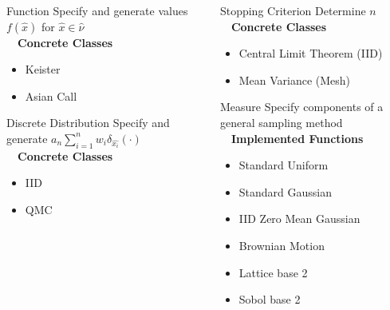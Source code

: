 \documentclass[final]{beamer}
\newlength{\onecolwid}
\newlength{\threecolwid}
\begin{document}
\begin{frame}[t]
\begin{columns}[t]
\begin{column}{\threecolwid}
\begin{columns}[t,totalwidth=\threecolwid]
\begin{column}{\onecolwid}
\begin{alertblock}{Function}
    Specify and generate values $f(\hat{x})$ for $\hat{x} \in \hat{\nu}$ \\~\
    \textbf{Concrete Classes}
    \begin{itemize}
        \item Keister
        \item Asian Call
    \end{itemize}
\end{alertblock}%

\begin{alertblock}{Discrete Distribution}
    Specify and generate $a_n \sum_{i=1}^n w_i \delta_{\hat{x_i}}(\cdot)$ \\~\
    \textbf{Concrete Classes}
    \begin{itemize}
        \item IID
        \item QMC
    \end{itemize}
\end{alertblock}
\end{column} 

\begin{column}{\onecolwid}%
\begin{alertblock}{Stopping Criterion}
    Determine $n$ \\~\
    \textbf{Concrete Classes}
    \begin{itemize}
        \item Central Limit Theorem (IID)
        \item Mean Variance (Mesh)
    \end{itemize}
\end{alertblock}%

\begin{alertblock}{Measure}
    Specify components of a general sampling method \\~\
    \textbf{Implemented Functions}
    \begin{itemize}
        \item Standard Uniform
        \item Standard Gaussian
        \item IID Zero Mean Gaussian
        \item Brownian Motion 
        \item Lattice base 2
        \item Sobol base 2
    \end{itemize}
\end{alertblock}%


\end{column}
\end{columns}
\end{column}
\end{columns}
\end{frame}
\end{document}
